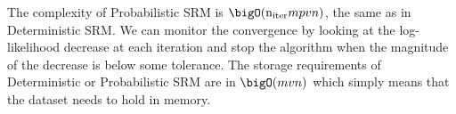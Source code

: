 The complexity of Probabilistic SRM is $\bigO(\mathrm{n_{iter}} mpvn)$, the same as in
Deterministic SRM.
We can monitor the convergence by looking at the log-likelihood decrease at each iteration
and stop the algorithm when the magnitude of the decrease is below some
tolerance.
The storage requirements of Deterministic or Probabilistic SRM are in
$\bigO(mvn)$ which simply means that the dataset needs to hold in memory.







